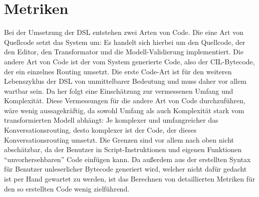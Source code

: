 \section{Metriken}
Bei der Umsetzung der DSL entstehen zwei Arten von Code. Die eine Art von Quellcode setzt das System um: Es handelt sich hierbei um den Quellcode, der den Editor, den Transformator und die Modell-Validierung implementiert. Die andere Art von Code ist der vom System generierte Code, also der CIL-Bytecode, der ein einzelnes Routing umsetzt. Die erste Code-Art ist für den weiteren Lebenszyklus der DSL von unmittelbarer Bedeutung und muss daher vor allem wartbar sein. Da her folgt eine Einschätzung zur vermessenen Umfang und Komplexität. Diese Vermessungen für die andere Art von Code durchzuführen, wäre  wenig aussagekräftig, da sowohl Umfang als auch Komplexität stark vom transformierten Modell abhängt: Je komplexer und umfangreicher das Konversationsrouting, desto komplexer ist der Code, der dieses Konversationsrouting umsetzt. Die Grenzen sind vor allem nach oben nicht abschätzbar, da der Benutzer in Script-Instruktionen und eigenen Funktionen ``unvorhersehbaren'' Code einfügen kann. Da außerdem aus der erstellten Syntax für Benutzer unleserlicher Bytecode generiert wird, welcher nicht dafür gedacht ist per Hand gewartet zu werden, ist das Berechnen von detaillierten Metriken für den so erstellten Code wenig zielführend. 

